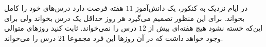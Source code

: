 \EXERCISE
در ایام نزدیک به کنکور، یک دانش‌آموز
$11$
هفته فرصت دارد درس‌های خود را کامل بخواند. برای این منظور تصمیم می‌گیرد هر روز حداقل یک درس بخواند ولی برای این‌که خسته نشود هیچ هفته‌ای بیش از
$12$
درس را نمی‌خواند. ثابت کنید روزهای متوالی وجود خواهد داشت که در آن روزها این فرد مجموعا
$21$
درس را می‌خواند.